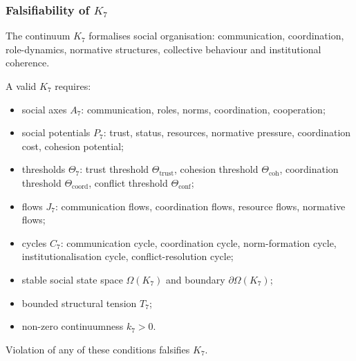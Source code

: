 
\subsubsection{Falsifiability of \texorpdfstring{$K_7$}{K_7}}
\label{sec:falsifiability-k7}

The continuum $K_7$ formalises social organisation:  
communication, coordination, role-dynamics, normative structures,
collective behaviour and institutional coherence.

A valid $K_7$ requires:

\begin{itemize}
    \item social axes $A_7$: communication, roles, norms, coordination, cooperation;
    \item social potentials $P_7$: trust, status, resources, normative pressure,
          coordination cost, cohesion potential;
    \item thresholds $\Theta_7$: trust threshold $\Theta_{\mathrm{trust}}$,
          cohesion threshold $\Theta_{\mathrm{coh}}$,
          coordination threshold $\Theta_{\mathrm{coord}}$,
          conflict threshold $\Theta_{\mathrm{conf}}$;
    \item flows $J_7$: communication flows, coordination flows,
          resource flows, normative flows;
    \item cycles $C_7$: communication cycle, coordination cycle,
          norm-formation cycle, institutionalisation cycle,
          conflict-resolution cycle;
    \item stable social state space $\Omega(K_7)$ and boundary $\partial\Omega(K_7)$;
    \item bounded structural tension $T_7$;
    \item non-zero continuumness $k_7>0$.
\end{itemize}

Violation of any of these conditions falsifies $K_7$.



